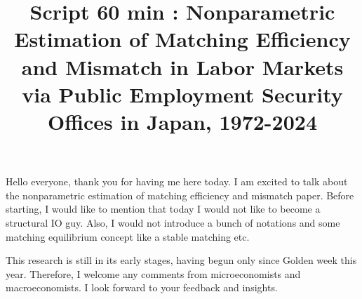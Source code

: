 \documentclass[12pt]{article}
\begin{document}
\title{Script 60 min : Nonparametric Estimation of Matching Efficiency and Mismatch in Labor Markets via Public Employment Security Offices in Japan, 1972-2024}
\maketitle


Hello everyone, thank you for having me here today. I am excited to talk about the nonparametric estimation of matching efficiency and mismatch paper. 
Before starting, I would like to mention that today I would not like to become a structural IO guy. 
Also, I would not introduce a bunch of notations and some matching equilibrium concept like a stable matching etc. 

This research is still in its early stages, having begun only since Golden week this year. Therefore, I welcome any comments from microeconomists and macroeconomists. 
I look forward to your feedback and insights.
\end{document}
